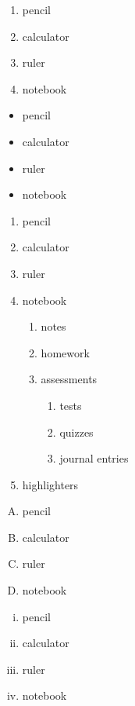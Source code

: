 \documentclass[11pt]{article}
\begin{document}
\begin{enumerate}
\item pencil
\item calculator
\item ruler
\item notebook
\end{enumerate}

\begin{itemize}
\item pencil
\item calculator
\item ruler
\item notebook
\end{itemize}

\pagebreak

\begin{enumerate}
\item pencil
\item calculator
\item ruler
\item notebook
    \begin{enumerate}
    \item notes
    \item homework
    \item assessments
        \begin{enumerate}
        \item tests
        \item quizzes
        \item journal entries
        \end{enumerate}
    \end{enumerate}
\item highlighters
\end{enumerate}

\vspace{1cm}

\begin{enumerate}[A.]
\item pencil
\item calculator
\item ruler
\item notebook
\end{enumerate}

\vspace{1cm}

\begin{enumerate}[i.]
\item pencil
\item calculator
\item ruler
\item notebook
\end{enumerate}
\end{document}
